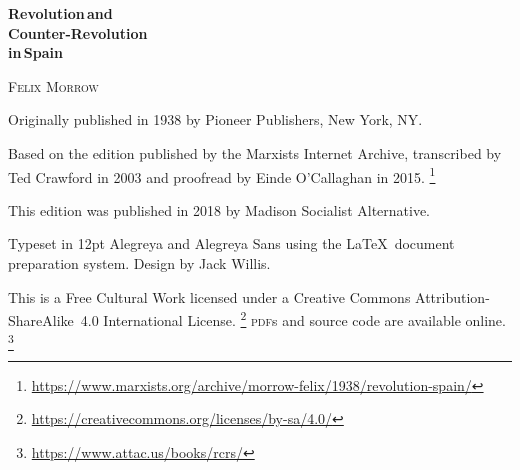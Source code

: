 \begin{titlepage}
	\setlength{\parindent}{0pt}
	
	\vspace*{\fill}
	
	{\sffamily\bfseries\fontsize{40}{40}\selectfont
		Revolution\,\textmd{and} \\
		Counter-Revolution \\
		\textmd{in}\,Spain
		\par}
	
	\vspace{60pt}
	
	{\fontsize{20}{20}\selectfont
		\textsc{Felix Morrow}
		\par}
	
	\vspace*{\fill}
	
\end{titlepage}

{
	\thispagestyle{empty}
	\setlength{\parindent}{0em}
	\setlength{\parskip}{0.5em}
	\sloppy
	\raggedright
	
	\vspace*{\fill}
	\vspace*{\fill}
	
	Originally published in 1938 by Pioneer Publishers, New York, NY.
	
	Based on the edition published by the Marxists Internet Archive, transcribed by Ted Crawford in 2003 and proofread by Einde O’Cal\-la\-ghan in 2015.%
	\footnote{\href{https://www.marxists.org/archive/morrow-felix/1938/revolution-spain/}{https://www.marxists.org/archive/morrow-felix/1938/revolution-spain/}}
	
	This edition was published in 2018 by Madison Socialist Alternative.
	
	Typeset in 12pt Alegreya and {\AlegreyaSans Alegreya Sans} using the \LaTeX\ document preparation system. Design by Jack Willis.
	
	This is a Free Cultural Work licensed under a Creative Commons Attribution-ShareAlike~4.0 International License.%
	\footnote{\href{https://creativecommons.org/licenses/by-sa/4.0/}{https://creativecommons.org/licenses/by-sa/4.0/}}
	\textsc{pdf}s and source code are available online.%
	\footnote{\href{https://www.attac.us/books/rcrs/}{https://www.attac.us/books/rcrs/}}
	
	\vspace*{\fill}
}